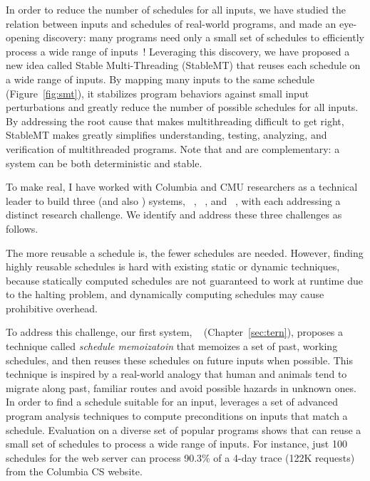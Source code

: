 In order to reduce the number of schedules for all inputs, we have studied the
relation between inputs and schedules of real-world programs, and made an
eye-opening discovery: many programs need only a small set of schedules to
efficiently process a wide range of inputs~\cite{smt:cacm}! Leveraging this
discovery, we have proposed a new idea called Stable Multi-Threading (StableMT)
that reuses each schedule on a wide range of inputs. By mapping many inputs to
the same schedule (Figure~\ref{fig:smt}), it stabilizes program behaviors
against small input perturbations and greatly reduce the number of possible
schedules for all inputs. By addressing the root cause that makes multithreading
difficult to get right, StableMT makes greatly simplifies understanding,
testing, analyzing, and verification of multithreaded programs. Note that \smt
and \dmt are complementary: a system can be both deterministic and stable.

To make \smt real, I have worked with Columbia and CMU researchers as a
technical leader to build three \smt (and also \dmt) systems,
\tern~\cite{cui:tern:osdi10}, \peregrine~\cite{peregrine:sosp11}, and
\parrot~\cite{parrot:sosp13}, with each addressing a distinct research
challenge. We identify and address these three challenges as follows.

 The more reusable a schedule is, the fewer schedules are needed.
However, finding highly reusable schedules is hard with existing static or
dynamic techniques, because statically computed schedules are not guaranteed to
work at runtime due to the halting problem, and dynamically computing schedules
may cause prohibitive overhead.

To address this challenge, our first \smt system, \tern~\cite{cui:tern:osdi10}
(Chapter~\ref{sec:tern}), proposes a technique called \emph{schedule
memoizatoin} that memoizes a set of past, working schedules, and then reuses
these schedules on future inputs when possible. This technique is inspired by a
real-world analogy that human and animals tend to migrate along past, familiar
routes and avoid possible hazards in unknown ones. In order to find a schedule
suitable for an input, \tern leverages a set of advanced program analysis
techniques to compute preconditions on inputs that match a schedule. Evaluation
on a diverse set of popular programs shows that \tern can reuse a small set of
schedules to process a wide range of inputs. For instance, just 100 schedules
for the \apache web server can process 90.3\% of a 4-day trace (122K requests)
from the Columbia CS website.

